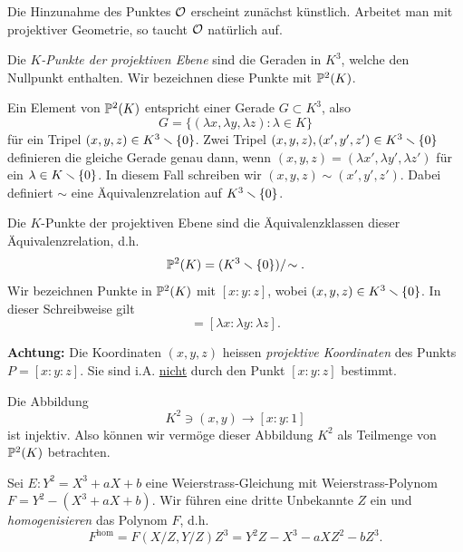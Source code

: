 Die Hinzunahme des Punktes ${\mathcal O}$ erscheint zunächst künstlich.
Arbeitet man mit projektiver Geometrie, so taucht ${\mathcal O}$  natürlich
auf.

\begin{definition}
  Die \emph{$K$-Punkte der projektiven Ebene} sind die Geraden in $K^3$,
  welche den Nullpunkt enthalten. Wir bezeichnen diese Punkte mit
  ${\mathbb{P}}^2(K)$. 
\end{definition}

\begin{bemerkung}
  Ein Element von ${\mathbb{P}}^2(K)$ entspricht einer Gerade $G\subset K^3$,
  also
  $$ G = \{ (\lambda x,\lambda y,\lambda z) : \lambda\in K\}$$
  für ein Tripel $(x,y,z)\in K^3\smallsetminus\{0\}$. Zwei Tripel
  $(x,y,z),(x',y',z')\in K^3\smallsetminus\{0\}$ definieren die gleiche Gerade
  genau dann, wenn
  $(x,y,z)=(\lambda x',\lambda y',\lambda z')$ für ein $\lambda\in
  K\smallsetminus\{0\}$.
  In diesem Fall schreiben wir $(x,y,z)\sim (x',y',z')$. Dabei
  definiert $\sim$ eine Äquivalenzrelation auf $K^3\smallsetminus\{0\}$.

  Die $K$-Punkte der projektiven Ebene sind die Äquivalenzklassen dieser
  Äquivalenzrelation, d.h. 
  \begin{equation*}
    {\mathbb{P}}^2(K) = (K^3\smallsetminus\{0\})/\!\sim.
  \end{equation*}
  Wir bezeichnen Punkte in ${\mathbb{P}}^2(K)$ mit $[x:y:z]$, wobei $(x,y,z)\in
  K^3\smallsetminus\{0\}$.
  In dieser Schreibweise gilt
  \begin{equation*}
    [x:y:z] = [\lambda x : \lambda y : \lambda z]. 
  \end{equation*}

  \textbf{Achtung:} Die Koordinaten $(x,y,z)$ heissen \emph{projektive
    Koordinaten} des Punkts $P=[x:y:z]$. Sie sind i.A.
  \underline{nicht} durch den Punkt $[x:y:z]$ bestimmt.

  Die Abbildung
  \begin{equation}
    \label{eq:affinechart}
    K^2\ni (x,y)\rightarrow [x:y:1] 
  \end{equation}
  ist injektiv. Also
  können wir vermöge dieser Abbildung $K^2$ als Teilmenge von
  ${\mathbb{P}}^2(K)$ betrachten. 
\end{bemerkung}


Sei $E: Y^2 = X^3+aX+b$ eine Weierstrass-Gleichung mit
Weierstrass-Polynom $F = Y^2 - (X^3+aX+b)$. Wir führen eine dritte
Unbekannte $Z$ ein und \emph{homogenisieren} das Polynom $F$, d.h.
\begin{equation}
  \label{eq:homogenisierung}
  F^{\mathrm{hom}} = F(X/Z,Y/Z)Z^3 = Y^2Z - X^3 - aXZ^2 -bZ^3.
\end{equation}

